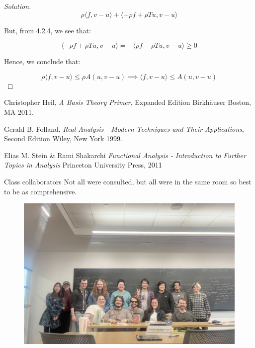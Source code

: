 \documentclass[10pt]{article}
\begin{document}
\begin{proof}[Solution]
$$ \rho \langle f, v - u \rangle + \langle - \rho f + \rho Tu, v - u \rangle$$

But, from 4.2.4, we see that:

$$ \langle - \rho f + \rho Tu, v - u \rangle  = -  \langle \rho f - \rho Tu, v - u \rangle \geq 0 $$

Hence, we conclude that:

$$ \rho \langle f, v - u \rangle \leq \rho A(u, v - u) \implies \langle f, v - u \rangle \leq A(u, v - u) $$





\end{proof}

\begin{thebibliography}{999}

  Christopher Heil,
  \emph{A Basis Theory Primer},
  Expanded Edition
  Birkhäuser Boston, MA
  2011.
  
  Gerald B. Folland,
  \emph{Real Analysis - Modern Techniques and Their Applications},
  Second Edition
  Wiley, New York
  1999.

  Elias M. Stein \& Rami Shakarchi
  \emph{Functional Analysis - Introduction to Further Topics in Analysis}
  Princeton University Press,
  2011

  Class collaborators
  Not all were consulted, but all were in the same room so best to be as comprehensive.
  \begin{figure}
    \includegraphics[width=\paperwidth]{FuNtional exam group}
  \end{figure}
  
  

\end{thebibliography}
\end{document}
